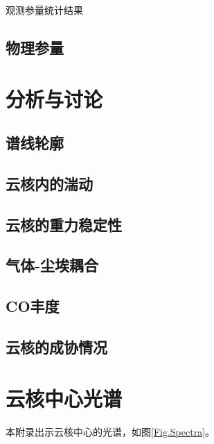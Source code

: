 \documentclass[UTF8, nocolorlinks]{pkuthss}
\begin{document}
		\begin{table}[H]
			\begin{footnotesize}
	        \begin{center}
	        \caption{观测参量统计结果\label{Tab.ObservedParaStat}}

	        \setlength{\tabcolsep}{0.04in}
	        \vspace{0.5em}

	        

	        \end{center}
	        \end{footnotesize}
        \end{table}

	\section{物理参量}

\chapter{分析与讨论}
	\section{谱线轮廓}
	\section{云核内的湍动}
	\section{云核的重力稳定性}
	\section{气体-尘埃耦合}
	\section{CO丰度}
	\section{云核的成协情况}

\appendix %

\printbibliography[heading = bibintoc]

\chapter{云核中心光谱}\label{App.Spectra}
	本附录出示云核中心的光谱，如图\ref{Fig.Spectra}。
\end{document}
